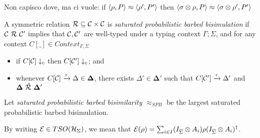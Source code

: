 {\color{red} Non capisco dove, ma ci vuole: if $\langle\rho, P\rangle \approx \langle\rho', P'\rangle$ then $\langle\sigma \otimes \rho, P\rangle \approx \langle\sigma \otimes \rho', P'\rangle$}

\begin{definition}
	A symmetric relation $\mathcal{R} \subseteq \mathcal{C} \times \mathcal{C}$ is \emph{saturated probabilistic barbed bisimulation} if $\conf\ \rel\ \conf'$ implies that $\mathcal{C}, \mathcal{C}'$ are well-typed under a typing context $\Gamma; \Sigma$, and for any context $C[\_] \in Context_{\Gamma, \Sigma}$
	\begin{itemize}
		\item if $C[\mathcal{C}] \downarrow_{c}$ then $C[\mathcal{C}'] \downarrow_{c}$; and 
		\item whenever $C[\mathcal{C}] \xrightarrow{\tau} \Delta \in \mathbf{\Delta}$, there exists $\Delta' \in \mathbf{\Delta'}$ such that $C[\mathcal{C}'] \xrightarrow{\tau} \Delta'$ and $\mathbf{\Delta}\ \sqlift{\rel}\ \mathbf{\Delta'}$
	\end{itemize}
	Let \emph{saturated probabilistic barbed bisimilarity} $\approx_{SPB}$ be the largest saturated probabilistic barbed bisimulation.
\end{definition}

By writing $\mathcal{E} \in TSO(\mathcal{H}_{\Sigma})$, we mean that $\mathcal{E}(\rho) = \sum_{i \in I} (I_{\overline{\Sigma}} \otimes A_i) \rho (I_{\overline{\Sigma}} \otimes A_i)^{\dagger}$.


